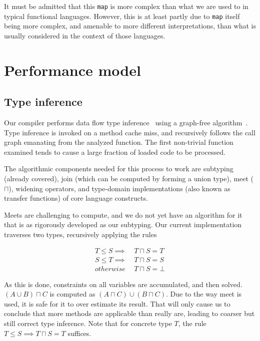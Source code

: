 It must be admitted that this \texttt{map} is more complex than
what we are used to in typical functional languages.
However, this is at least partly due to \texttt{map} itself
being more complex, and amenable to more different interpretations,
than what is usually considered in the context of those languages.



\section{Performance model}

\subsection{Type inference}

Our compiler performs data flow type inference~\cite{kaplanullman,abstractinterp}
using a graph-free algorithm~\cite{graphfree}.
Type inference is invoked on a method cache miss, and recursively follows the
call graph emanating from the analyzed function.
The first non-trivial function examined tends to cause a large fraction of
loaded code to be processed.

The algorithmic components needed for this process to work are subtyping
(already covered), join (which can be computed by forming a union type),
meet ($\sqcap$), widening operators, and type-domain implementations
(also known as transfer functions) of core language constructs.

Meets are challenging to compute, and we do not yet have an algorithm for
it that is as rigorously developed as our subtyping.
Our current implementation traverses two types, recursively applying the
rules

\vspace{-3ex}
\begin{singlespace}
\begin{align*}
T\leq S  \implies &\ T\sqcap S = T \\
S\leq T  \implies &\ T\sqcap S = S \\
         otherwise\ &\ T\sqcap S = \bot
\end{align*}
\end{singlespace}

\noindent
As this is done, constraints on all variables are accumulated, and then
solved.
$(A\cup B)\sqcap C$ is computed as $(A\sqcap C) \cup (B\sqcap C)$.
Due to the way meet is used, it is safe for it to over estimate its
result.
That will only cause us to conclude that more methods are applicable
than really are, leading to coarser but still correct type inference.
Note that for concrete type $T$, the rule
$T\leq S \implies T\sqcap S = T$ suffices.

